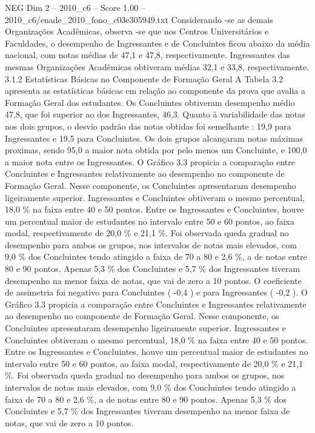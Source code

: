 \begin{textsample}{NEG Dim 2 – 2010\_c6 – Score 1.00 – 2010\_c6/enade\_2010\_fono\_c03e305949.txt}
Considerando -se as demais Organizações Acadêmicas, observa -se que nos Centros Universitários e Faculdades, o desempenho de Ingressantes e de Concluintes ficou abaixo da média nacional, com notas médias de 47,1 e 47,8, respectivamente.
Ingressantes das mesmas Organizações Acadêmicas obtiveram médias 32,1 e 33,8, respectivamente. 3.1.2 Estatísticas Básicas no Componente de Formação Geral A Tabela 3.2 apresenta as estatísticas básicas em relação ao componente da prova que avalia a Formação Geral dos estudantes.
Os Concluintes obtiveram desempenho médio 47,8, que foi superior ao dos Ingressantes, 46,3.
Quanto à variabilidade das notas nos dois grupos, o desvio padrão das notas obtidas foi semelhante : 19,9 para Ingressantes e 19,5 para Concluintes.
Os dois grupos alcançaram notas máximas proximas, sendo 95,0 a maior nota obtida por pelo menos um Concluinte, e 100,0 a maior nota entre os Ingressantes.
O Gráfico 3.3 propicia a comparação entre Concluintes e Ingressantes relativamente ao desempenho no componente de Formação Geral.
Nesse componente, os Concluintes apresentaram desempenho ligeiramente superior.
Ingressantes e Concluintes obtiveram o mesmo percentual, 18,0 \% na faixa entre 40 e 50 pontos.
Entre os Ingressantes e Concluintes, houve um percentual maior de estudantes no intervalo entre 50 e 60 pontos, ao faixa modal, respectivamente de 20,0 \% e 21,1 \%.
Foi observada queda gradual no desempenho para ambos os grupos, nos intervalos de notas mais elevados, com 9,0 \% dos Concluintes tendo atingido a faixa de 70 a 80 e 2,6 \%, a de notas entre 80 e 90 pontos.
Apenas 5,3 \% dos Concluintes e 5,7 \% dos Ingressantes tiveram desempenho na menor faixa de notas, que vai de zero a 10 pontos.
O coeficiente de assimetria foi negativo para Concluintes ( -0,4 ) e para Ingressantes ( -0,2 ).
O Gráfico 3.3 propicia a comparação entre Concluintes e Ingressantes relativamente ao desempenho no componente de Formação Geral.
Nesse componente, os Concluintes apresentaram desempenho ligeiramente superior.
Ingressantes e Concluintes obtiveram o mesmo percentual, 18,0 \% na faixa entre 40 e 50 pontos.
Entre os Ingressantes e Concluintes, houve um percentual maior de estudantes no intervalo entre 50 e 60 pontos, ao faixa modal, respectivamente de 20,0 \% e 21,1 \%.
Foi observada queda gradual no desempenho para ambos os grupos, nos intervalos de notas mais elevados, com 9,0 \% dos Concluintes tendo atingido a faixa de 70 a 80 e 2,6 \%, a de notas entre 80 e 90 pontos.
Apenas 5,3 \% dos Concluintes e 5,7 \% dos Ingressantes tiveram desempenho na menor faixa de notas, que vai de zero a 10 pontos.

\end{textsample}
